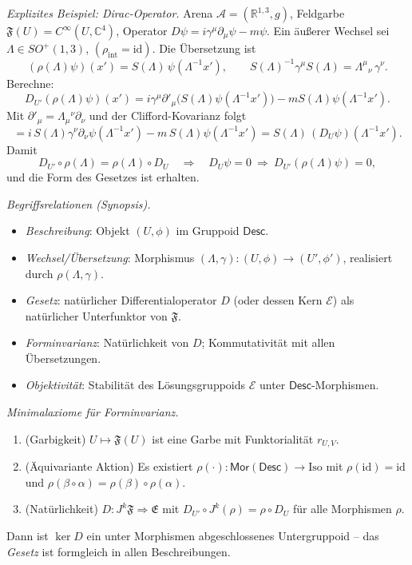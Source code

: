 \documentclass[10pt, letterpaper]{article}
\newcommand{\R}{\mathbb{R}}
\newcommand{\C}{\mathbb{C}}
\begin{document}
\emph{Explizites Beispiel: Dirac-Operator.}
Arena $\mathcal A=(\R^{1,3},g)$, Feldgarbe $\mathfrak F(U)=C^\infty(U,\C^4)$,
Operator $D\psi=i\gamma^\mu\partial_\mu\psi - m\psi$.
Ein äußerer Wechsel sei $\Lambda\in SO^+(1,3)$, $(\rho_{\mathrm{int}}=\mathrm{id})$.
Die Übersetzung ist
\[
(\rho(\Lambda)\psi)(x')=S(\Lambda)\,\psi(\Lambda^{-1}x'),\qquad
S(\Lambda)^{-1}\gamma^\mu S(\Lambda)=\Lambda^\mu{}_\nu\,\gamma^\nu.
\]
Berechne:
\[
D_{U'}(\rho(\Lambda)\psi)(x')
= i\gamma^\mu\partial'_\mu\big(S(\Lambda)\psi(\Lambda^{-1}x')\big)-mS(\Lambda)\psi(\Lambda^{-1}x').
\]
Mit $\partial'_\mu=\Lambda_\mu{}^\nu\partial_\nu$ und der Clifford-Kovarianz folgt
\[
= i\,S(\Lambda)\gamma^\nu\partial_\nu\psi(\Lambda^{-1}x')-m\,S(\Lambda)\psi(\Lambda^{-1}x')
= S(\Lambda)\,(D_U\psi)(\Lambda^{-1}x').
\]
Damit
\[
D_{U'}\circ \rho(\Lambda)=\rho(\Lambda)\circ D_U
\quad\Rightarrow\quad
D_U\psi=0\ \Longrightarrow\ D_{U'}(\rho(\Lambda)\psi)=0,
\]
und die Form des Gesetzes ist erhalten.

\emph{Begriffsrelationen (Synopsis).}
\begin{itemize}
\item \emph{Beschreibung}: Objekt $(U,\phi)$ im Gruppoid $\mathsf{Desc}$.
\item \emph{Wechsel/Übersetzung}: Morphismus $(\Lambda,\gamma):(U,\phi)\to(U',\phi')$, realisiert durch $\rho(\Lambda,\gamma)$.
\item \emph{Gesetz}: natürlicher Differentialoperator $D$ (oder dessen Kern $\mathcal E$) als natürlicher Unterfunktor von $\mathfrak F$.
\item \emph{Forminvarianz}: Natürlichkeit von $D$; Kommutativität mit allen Übersetzungen.
\item \emph{Objektivität}: Stabilität des Lösungsgruppoids $\mathcal E$ unter $\mathsf{Desc}$-Morphismen.
\end{itemize}

\emph{Minimalaxiome für Forminvarianz.}
\begin{enumerate}
\item (Garbigkeit) $U\mapsto\mathfrak F(U)$ ist eine Garbe mit Funktorialität $r_{U,V}$.
\item (Äquivariante Aktion) Es existiert $\rho(\cdot):\mathsf{Mor}(\mathsf{Desc})\to \mathrm{Iso}$ mit
$\rho(\mathrm{id})=\mathrm{id}$ und $\rho(\beta\circ\alpha)=\rho(\beta)\circ\rho(\alpha)$.
\item (Natürlichkeit) $D:J^k\mathfrak F\Rightarrow\mathfrak E$ mit
$D_{U'}\circ J^k(\rho)=\rho\circ D_U$ für alle Morphismen $\rho$.
\end{enumerate}
Dann ist $\ker D$ ein unter Morphismen abgeschlossenes Untergruppoid – das \emph{Gesetz} ist formgleich in allen Beschreibungen.
\end{document}
